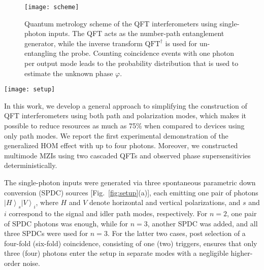 \documentclass[aps,prl,twocolumn,superscriptaddress]{revtex4-1}
\begin{document}
\begin{figure}[b]
\texttt{[image: scheme]}
\caption{\label{fig:scheme} Quantum metrology scheme of the QFT interferometers using single-photon inputs. The QFT acts as the number-path entanglement generator, while the inverse transform $\mbox{QFT}^{\dag}$ is used for un-entangling the probe. Counting coincidence events with one photon per output mode leads to the probability distribution that is used to estimate the unknown phase $\varphi$.}
\end{figure}

\begin{figure*}[t]
	\texttt{[image: setup]}
	\caption{\label{fig:setup} Experimental setup. (a) The single photon sources. Photons are produced in three nonlinear crystals (BBO) via spontaneous parametric down conversion. Motorized translation stages $\Delta {d_1}$ -- $\Delta {d_3}$ (not drawn in the figure) were used to synchronize the delays among paths one to four. The quantum metrology optical circuit with (b) four, (c) two, and (d) three single-photon inputs. The labels are: DM, dichroic mirror; PBS, polarizing beam splitter; PDBS, polarization-dependent beam splitter; NBS, non-polarizing beam splitter; HWP (QWP), half (quarter) wave plate; Prism used as phase shifter between different paths; IF, interferential filter; D1, D2, D3, D4, T1, T2, fiber-coupled single-photon detectors.}
\end{figure*}

In this work, we develop a general approach to simplifying the construction of QFT interferometers using both path and polarization modes, which makes it possible to reduce resources as much as 75\% when compared to devices using only path modes. We report the first experimental demonstration of the generalized HOM effect with up to four photons. Moreover, we constructed multimode MZIs using two cascaded QFTs and observed phase supersensitivies deterministically.

The single-photon inputs were generated via three spontaneous parametric down conversion (SPDC) sources [Fig.~\ref{fig:setup}(a)], each emitting one pair of photons ${\left| H \right\rangle _s}{\left| V \right\rangle _i}$, where $H$ and $V$ denote horizontal and vertical polarizations, and $s$ and $i$ correspond to the signal and idler path modes, respectively. For $n=2$, one pair of SPDC photons was enough, while for $n=3$, another SPDC was added, and all three SPDCs were used for $n=3$. For the latter two cases, post selection of a four-fold (six-fold) coincidence, consisting of one (two) triggers, ensures that only three (four) photons enter the setup in separate modes with a negligible higher-order noise.
\end{document}
